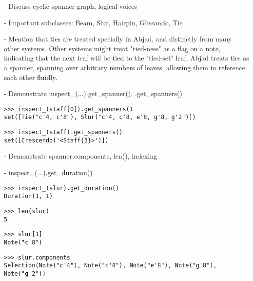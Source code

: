 -   Discuss cyclic spanner graph, logical voices

-   Important subclasses: Beam, Slur, Hairpin, Glissando, Tie

-   Mention that ties are treated specially in Abjad, and distinctly from many
    other systems. Other systems might treat "tied-ness" as a flag on a note,
    indicating that the next leaf will be tied to the "tied-set" leaf. Abjad
    treats ties as a spanner, spanning over arbitrary numbers of leaves,
    allowing them to reference each other fluidly.

-   Demonstrate inspect\_(...).get\_spanner(), .get\_spanners()

\begin{comment}
<abjad>
inspect_(staff[0]).get_spanners()
inspect_(staff).get_spanners()
</abjad>
\end{comment}

\begin{abjadbookoutput}
\begin{singlespacing}
\vspace{-0.5\baselineskip}
\begin{lstlisting}
>>> inspect_(staff[0]).get_spanners()
set([Tie("c'4, c'8"), Slur("c'4, c'8, e'8, g'8, g'2")])
\end{lstlisting}
\begin{lstlisting}
>>> inspect_(staff).get_spanners()
set([Crescendo('<Staff{3}>')])
\end{lstlisting}
\end{singlespacing}
\end{abjadbookoutput}

-   Demonstrate spanner.components, len(), indexing

-   inspect\_(...).get\_duration()

\begin{comment}
<abjad>
inspect_(slur).get_duration()
len(slur)
slur[1]
slur.components
</abjad>
\end{comment}

\begin{abjadbookoutput}
\begin{singlespacing}
\vspace{-0.5\baselineskip}
\begin{lstlisting}
>>> inspect_(slur).get_duration()
Duration(1, 1)
\end{lstlisting}
\begin{lstlisting}
>>> len(slur)
5
\end{lstlisting}
\begin{lstlisting}
>>> slur[1]
Note("c'8")
\end{lstlisting}
\begin{lstlisting}
>>> slur.components
Selection(Note("c'4"), Note("c'8"), Note("e'8"), Note("g'8"), Note("g'2"))
\end{lstlisting}
\end{singlespacing}
\end{abjadbookoutput}

